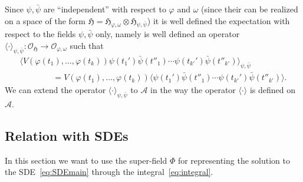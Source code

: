 \documentclass[a4paper,10pt]{article}
\newcommand{\comma}{{,}}
\newcommand{\nobracket}{}
\begin{document}
\begin{remark}
  Since $\psi, \bar{\psi}$ are ``independent'' with respect to $\varphi$ and
  $\omega$ (since their can be realized on a space of the form
  $\mathfrak{H}=\mathfrak{H}_{\varphi, \omega} \otimes \mathfrak{H}_{\psi
  \comma \bar{\psi}}$) it is well defined the expectation with respect to the
  fields $\psi, \bar{\psi}$ only, namely is well defined an operator $\langle
  \cdot \rangle_{\psi, \bar{\psi}} : \mathcal{O_{\mathfrak{H}}} \rightarrow
  \mathcal{O}_{\mathfrak{\varphi, \omega}}$ such that
  \[ \begin{array}{l}
       \langle V (\varphi (t_1), \ldots, \varphi (t_k)) \psi (t_1') \bar{\psi}
       (t''_1) \cdots \psi (t_{k'}') \bar{\psi} (t''_{k'}) \rangle_{\psi,
       \bar{\psi}}\\
       \qquad \qquad = V (\varphi (t_1), \ldots, \varphi (t_k)) \langle \psi
       (t_1') \bar{\psi} (t''_1) \cdots \psi (t_{k'}') \bar{\psi} (t''_{k'})
       \rangle . \nobracket
     \end{array} \]
  We can extend the operator $\langle \cdot \rangle_{\psi, \bar{\psi}}$ to
  $\mathcal{A}$ in the way the operator $\langle \cdot \rangle$ is defined on
  $\mathcal{A}$.
\end{remark}

\subsection{Relation with SDEs}

In this section we want to use the super-field $\Phi$ for representing the
solution to the SDE~{\eqref{eq:SDEmain}} through the
integral~{\eqref{eq:integral}}.

\
\end{document}
